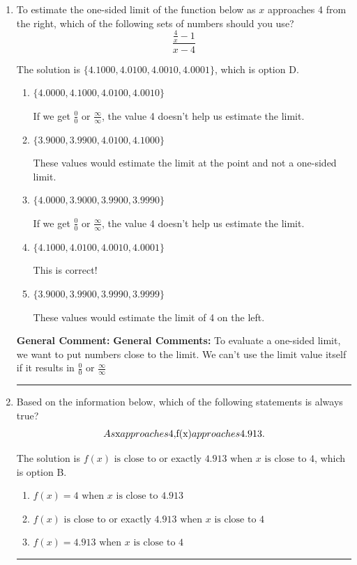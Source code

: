 \documentclass{extbook}[14pt]
\newcommand{\litem}[1]{\item #1

\rule{\textwidth}{0.4pt}}
\begin{document}
\begin{enumerate}\litem{
To estimate the one-sided limit of the function below as $x$ approaches 4 from the right, which of the following sets of numbers should you use?
\[ \frac{\frac{4}{x} - 1}{x - 4} \]

The solution is \( \{ 4.1000, 4.0100, 4.0010, 4.0001 \} \), which is option D.\begin{enumerate}[label=\Alph*.]
\item \( \{ 4.0000, 4.1000, 4.0100, 4.0010 \} \)

If we get $\frac{0}{0}$ or $\frac{\infty}{\infty}$, the value 4 doesn't help us estimate the limit.
\item \( \{ 3.9000, 3.9900, 4.0100, 4.1000 \} \)

These values would estimate the limit at the point and not a one-sided limit.
\item \( \{ 4.0000, 3.9000, 3.9900, 3.9990 \} \)

If we get $\frac{0}{0}$ or $\frac{\infty}{\infty}$, the value 4 doesn't help us estimate the limit.
\item \( \{ 4.1000, 4.0100, 4.0010, 4.0001 \} \)

This is correct!
\item \( \{ 3.9000, 3.9900, 3.9990, 3.9999 \} \)

These values would estimate the limit of 4 on the left.
\end{enumerate}

\textbf{General Comment:} \textbf{General Comments:} To evaluate a one-sided limit, we want to put numbers close to the limit. We can't use the limit value itself if it results in $\frac{0}{0}$ or $\frac{\infty}{\infty}$
}
\litem{
Based on the information below, which of the following statements is always true?
\[ As $x$ approaches $4$, $f(x)$ approaches $4.913$. \]

The solution is \( f(x) \text{ is close to or exactly } 4.913 \text{ when } x \text{ is close to } 4 \), which is option B.\begin{enumerate}[label=\Alph*.]
\item \( f(x) = 4 \text{ when } x \text{ is close to } 4.913 \)


\item \( f(x) \text{ is close to or exactly } 4.913 \text{ when } x \text{ is close to } 4 \)


\item \( f(x) = 4.913 \text{ when } x \text{ is close to } 4 \)



\end{enumerate}}
\end{enumerate}
\end{document}

